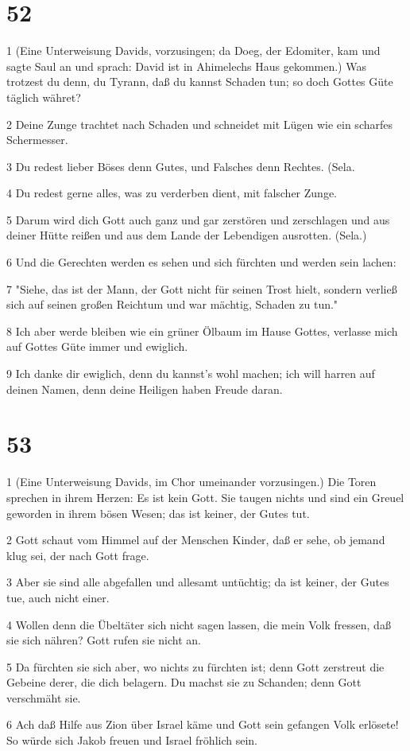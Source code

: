\chapter{52}

\par 1 (Eine Unterweisung Davids, vorzusingen; da Doeg, der Edomiter, kam und sagte Saul an und sprach: David ist in Ahimelechs Haus gekommen.) Was trotzest du denn, du Tyrann, daß du kannst Schaden tun; so doch Gottes Güte täglich währet?
\par 2 Deine Zunge trachtet nach Schaden und schneidet mit Lügen wie ein scharfes Schermesser.
\par 3 Du redest lieber Böses denn Gutes, und Falsches denn Rechtes. (Sela.
\par 4 Du redest gerne alles, was zu verderben dient, mit falscher Zunge.
\par 5 Darum wird dich Gott auch ganz und gar zerstören und zerschlagen und aus deiner Hütte reißen und aus dem Lande der Lebendigen ausrotten. (Sela.)
\par 6 Und die Gerechten werden es sehen und sich fürchten und werden sein lachen:
\par 7 "Siehe, das ist der Mann, der Gott nicht für seinen Trost hielt, sondern verließ sich auf seinen großen Reichtum und war mächtig, Schaden zu tun."
\par 8 Ich aber werde bleiben wie ein grüner Ölbaum im Hause Gottes, verlasse mich auf Gottes Güte immer und ewiglich.
\par 9 Ich danke dir ewiglich, denn du kannst's wohl machen; ich will harren auf deinen Namen, denn deine Heiligen haben Freude daran.

\chapter{53}

\par 1 (Eine Unterweisung Davids, im Chor umeinander vorzusingen.) Die Toren sprechen in ihrem Herzen: Es ist kein Gott. Sie taugen nichts und sind ein Greuel geworden in ihrem bösen Wesen; das ist keiner, der Gutes tut.
\par 2 Gott schaut vom Himmel auf der Menschen Kinder, daß er sehe, ob jemand klug sei, der nach Gott frage.
\par 3 Aber sie sind alle abgefallen und allesamt untüchtig; da ist keiner, der Gutes tue, auch nicht einer.
\par 4 Wollen denn die Übeltäter sich nicht sagen lassen, die mein Volk fressen, daß sie sich nähren? Gott rufen sie nicht an.
\par 5 Da fürchten sie sich aber, wo nichts zu fürchten ist; denn Gott zerstreut die Gebeine derer, die dich belagern. Du machst sie zu Schanden; denn Gott verschmäht sie.
\par 6 Ach daß Hilfe aus Zion über Israel käme und Gott sein gefangen Volk erlösete! So würde sich Jakob freuen und Israel fröhlich sein.

